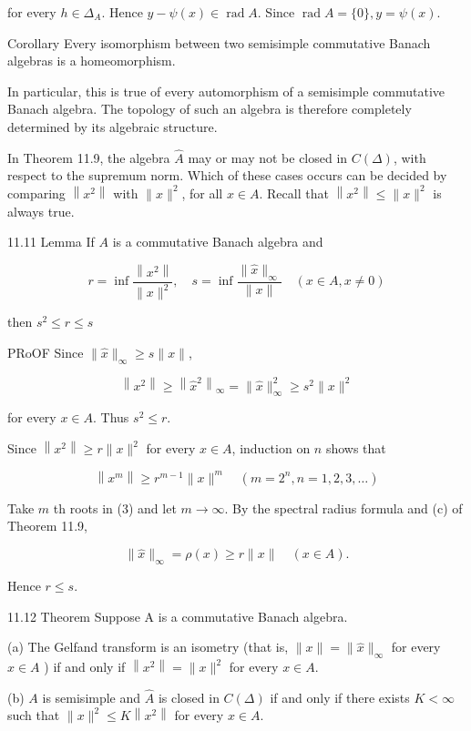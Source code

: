 \documentclass[10pt]{article}
\begin{document}
for every $h \in \Delta_{A}$. Hence $y-\psi(x) \in \operatorname{rad} A$. Since $\operatorname{rad} A=\{0\}, y=\psi(x)$.

Corollary Every isomorphism between two semisimple commutative Banach algebras is a homeomorphism.

In particular, this is true of every automorphism of a semisimple commutative Banach algebra. The topology of such an algebra is therefore completely determined by its algebraic structure.

In Theorem 11.9, the algebra $\widehat{A}$ may or may not be closed in $C(\Delta)$, with respect to the supremum norm. Which of these cases occurs can be decided by comparing $\left\|x^{2}\right\|$ with $\|x\|^{2}$, for all $x \in A$. Recall that $\left\|x^{2}\right\| \leq\|x\|^{2}$ is always true.

11.11 Lemma If $A$ is a commutative Banach algebra and

$$
r=\inf \frac{\left\|x^{2}\right\|}{\|x\|^{2}}, \quad s=\inf \frac{\|\hat{x}\|_{\infty}}{\|x\|} \quad(x \in A, x \neq 0)
$$

then $s^{2} \leq r \leq s$

PRoOF Since $\|\hat{x}\|_{\infty} \geq s\|x\|$,

$$
\left\|x^{2}\right\| \geq\left\|\hat{x}^{2}\right\|_{\infty}=\|\hat{x}\|_{\infty}^{2} \geq s^{2}\|x\|^{2}
$$

for every $x \in A$. Thus $s^{2} \leq r$.

Since $\left\|x^{2}\right\| \geq r\|x\|^{2}$ for every $x \in A$, induction on $n$ shows that

$$
\left\|x^{m}\right\| \geq r^{m-1}\|x\|^{m} \quad\left(m=2^{n}, n=1,2,3, \ldots\right)
$$

Take $m$ th roots in (3) and let $m \rightarrow \infty$. By the spectral radius formula and (c) of Theorem 11.9,

$$
\|\hat{x}\|_{\infty}=\rho(x) \geq r\|x\| \quad(x \in A) .
$$

Hence $r \leq s$.

11.12 Theorem Suppose A is a commutative Banach algebra.

(a) The Gelfand transform is an isometry (that is, $\|x\|=\|\hat{x}\|_{\infty}$ for every $x \in A$ ) if and only if $\left\|x^{2}\right\|=\|x\|^{2}$ for every $x \in A$.

(b) $A$ is semisimple and $\hat{A}$ is closed in $C(\Delta)$ if and only if there exists $K<\infty$ such that $\|x\|^{2} \leq K\left\|x^{2}\right\|$ for every $x \in A$.
\end{document}
